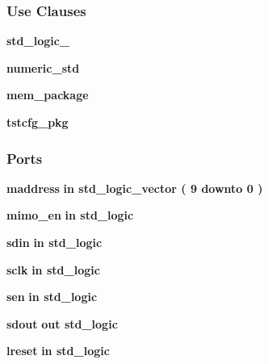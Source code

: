 \subsubsection*{Use Clauses}
 \begin{DoxyCompactItemize}
\item 
{\bf std\+\_\+logic\+\_}   
\item 
{\bf numeric\+\_\+std}   
\item 
{\bf mem\+\_\+package}   
\item 
{\bf tstcfg\+\_\+pkg}   
\end{DoxyCompactItemize}
\subsubsection*{Ports}
 \begin{DoxyCompactItemize}
\item 
{\bf maddress}  {\bfseries {\bfseries \textcolor{keywordflow}{in}\textcolor{vhdlchar}{ }}} {\bfseries \textcolor{comment}{std\+\_\+logic\+\_\+vector}\textcolor{vhdlchar}{ }\textcolor{vhdlchar}{(}\textcolor{vhdlchar}{ }\textcolor{vhdlchar}{ } \textcolor{vhdldigit}{9} \textcolor{vhdlchar}{ }\textcolor{keywordflow}{downto}\textcolor{vhdlchar}{ }\textcolor{vhdlchar}{ } \textcolor{vhdldigit}{0} \textcolor{vhdlchar}{ }\textcolor{vhdlchar}{)}\textcolor{vhdlchar}{ }} 
\item 
{\bf mimo\+\_\+en}  {\bfseries {\bfseries \textcolor{keywordflow}{in}\textcolor{vhdlchar}{ }}} {\bfseries \textcolor{comment}{std\+\_\+logic}\textcolor{vhdlchar}{ }} 
\item 
{\bf sdin}  {\bfseries {\bfseries \textcolor{keywordflow}{in}\textcolor{vhdlchar}{ }}} {\bfseries \textcolor{comment}{std\+\_\+logic}\textcolor{vhdlchar}{ }} 
\item 
{\bf sclk}  {\bfseries {\bfseries \textcolor{keywordflow}{in}\textcolor{vhdlchar}{ }}} {\bfseries \textcolor{comment}{std\+\_\+logic}\textcolor{vhdlchar}{ }} 
\item 
{\bf sen}  {\bfseries {\bfseries \textcolor{keywordflow}{in}\textcolor{vhdlchar}{ }}} {\bfseries \textcolor{comment}{std\+\_\+logic}\textcolor{vhdlchar}{ }} 
\item 
{\bf sdout}  {\bfseries {\bfseries \textcolor{keywordflow}{out}\textcolor{vhdlchar}{ }}} {\bfseries \textcolor{comment}{std\+\_\+logic}\textcolor{vhdlchar}{ }} 
\item 
{\bf lreset}  {\bfseries {\bfseries \textcolor{keywordflow}{in}\textcolor{vhdlchar}{ }}} {\bfseries \textcolor{comment}{std\+\_\+logic}\textcolor{vhdlchar}{ }} 

\end{DoxyCompactItemize}
